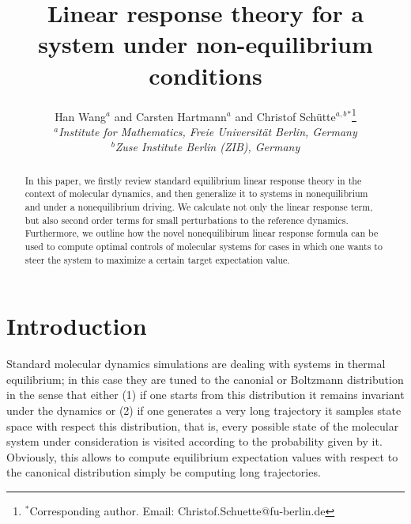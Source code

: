\documentclass[]{tMPH2e}
\begin{document}
\title{Linear response theory for a system under non-equilibrium conditions}

\author{Han Wang$^{a}$ and Carsten Hartmann$^{a}$ and Christof Sch\"utte$^{a,b}$$^{\ast}$\thanks{$^\ast$Corresponding author. Email: Christof.Schuette@fu-berlin.de}\\\vspace{6pt}$^{a}${\em Institute for Mathematics, Freie Universit\"at Berlin, Germany}\\$^{b}${\em Zuse Institute Berlin (ZIB), Germany}}
  


\maketitle

\begin{abstract}
  In this paper, we firstly review standard equilibrium linear response
  theory in the context of molecular dynamics, and then generalize it to systems in nonequilibrium and under a nonequilibrium
  driving. We calculate not only the linear response term, but also
  second order terms for small perturbations to the reference dynamics. Furthermore, we outline how the novel nonequilibirum linear response formula can be used to compute optimal controls of molecular systems for cases in which one wants to steer the system to maximize a certain target expectation value.

\end{abstract}


\section{Introduction}

Standard molecular dynamics simulations are dealing with systems in thermal equilibrium; in this case they are tuned to the canonial or Boltzmann distribution in the sense that either (1) if one starts from this distribution it remains invariant under the dynamics or (2) if one generates a very long trajectory it samples state space with respect this distribution, that is, every possible state of the molecular system under consideration is visited according to the probability given by it.  Obviously, this allows to compute equilibrium expectation values with respect to the  canonical distribution simply be computing long trajectories. 
\end{document}
